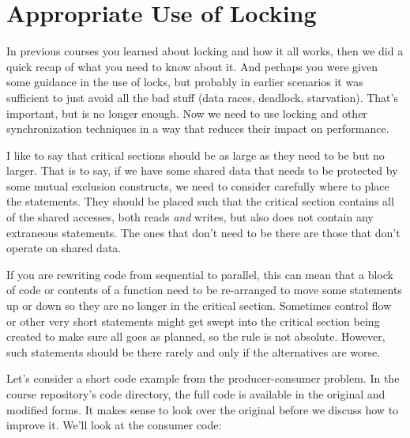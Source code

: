 




\section*{Appropriate Use of Locking}

In previous courses you learned about locking and how it all works, then we did a quick recap of what you need to know about it. And perhaps you were given some guidance in the use of locks, but probably in earlier scenarios it was sufficient to just avoid all the bad stuff (data races, deadlock, starvation). That's important, but is no longer enough. Now we need to use locking and other synchronization techniques in a way that reduces their impact on performance.

I like to say that critical sections should be as large as they need to be but no larger. That is to say, if we have some shared data that needs to be protected by some mutual exclusion constructs, we need to consider carefully where to place the statements. They should be placed such that the critical section contains all of the shared accesses, both reads \textit{and} writes, but also does not contain any extraneous statements. The ones that don't need to be there are those that don't operate on shared data.

If you are rewriting code from sequential to parallel, this can mean that a block of code or contents of a function need to be re-arranged to move some statements up or down so they are no longer in the critical section. Sometimes control flow or other very short statements might get swept into the critical section being created to make sure all goes as planned, so the rule is not absolute. However, such statements should be there rarely and only if the alternatives are worse.

Let's consider a short code example from the producer-consumer problem. In the course repository's code directory, the full code is available in the original and modified forms. It makes sense to look over the original before we discuss how to improve it. We'll look at the consumer code:

